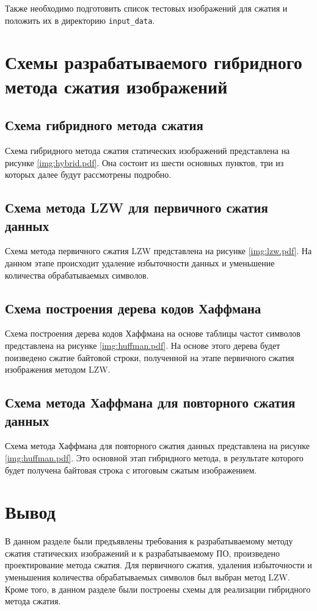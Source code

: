 Также необходимо подготовить список тестовых изображений для сжатия и положить их в директорию \texttt{input\_data}.


\section{Схемы разрабатываемого гибридного метода \mbox{сжатия} изображений}

\subsection{Схема гибридного метода сжатия}

Схема гибридного метода сжатия статических изображений представлена на рисунке \ref{img:hybrid.pdf}. Она состоит из шести основных пунктов, три из которых далее будут рассмотрены подробно.

\clearpage
\subsection{Схема метода LZW для первичного сжатия \mbox{данных}}

Схема метода первичного сжатия LZW представлена на рисунке \ref{img:lzw.pdf}. На данном этапе происходит удаление избыточности данных и уменьшение количества обрабатываемых символов.

\clearpage
\subsection{Схема построения дерева кодов Хаффмана}

Схема построения дерева кодов Хаффмана на основе таблицы частот символов представлена на рисунке \ref{img:huffman.pdf}. На основе этого дерева будет поизведено сжатие байтовой строки, полученной на этапе первичного сжатия изображения методом LZW.

\clearpage
\subsection{Схема метода Хаффмана для повторного \mbox{сжатия} данных}

Схема метода Хаффмана для повторного сжатия данных представлена на рисунке \ref{img:huffman.pdf}. Это основной этап гибридного метода, в результате которого будет получена байтовая строка с итоговым сжатым изображением.

\section*{Вывод}

В данном разделе были предъявлены требования к разрабатываемому методу сжатия статических изображений и к разрабатываемому ПО, произведено проектирование метода сжатия. Для первичного сжатия, удаления избыточности и уменьшения количества обрабатываемых символов был выбран метод LZW. Кроме того, в данном разделе были построены схемы для реализации гибридного метода сжатия.
